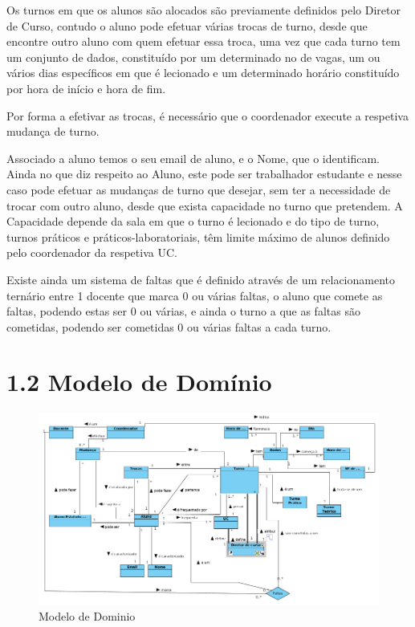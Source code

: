 \documentclass[12pt,a4paper]{report}
\begin{document}
Os turnos em que os alunos são alocados são previamente definidos pelo Diretor de
Curso, contudo o aluno pode efetuar várias trocas de turno, desde que encontre outro aluno
com quem efetuar essa troca, uma vez que cada turno tem um conjunto de dados,
constituído por um determinado no de vagas, um ou vários dias específicos em que é
lecionado e um determinado horário constituído por hora de início e hora de fim.

Por forma a efetivar as trocas, é necessário que o coordenador execute a respetiva
mudança de turno.

Associado a aluno temos o seu email de aluno, e o Nome, que o identificam. Ainda
no que diz respeito ao Aluno, este pode ser trabalhador estudante e nesse caso pode
efetuar as mudanças de turno que desejar, sem ter a necessidade de trocar com outro
aluno, desde que exista capacidade no turno que pretendem. A Capacidade depende da
sala em que o turno é lecionado e do tipo de turno, turnos práticos e práticos-laboratoriais,
têm limite máximo de alunos definido pelo coordenador da respetiva UC.

Existe ainda um sistema de faltas que é definido através de um relacionamento
ternário entre 1 docente que marca 0 ou várias faltas, o aluno que comete as faltas,
podendo estas ser 0 ou várias, e ainda o turno a que as faltas são cometidas, podendo ser
cometidas 0 ou várias faltas a cada turno.

\section{1.2 Modelo de Domínio}
\begin{figure}[H]
	\centering %
	\includegraphics[width=\textwidth]{imgs/ModeloDominio.png}
	\caption{Modelo de Dominio}
\end{figure}
\end{document}
